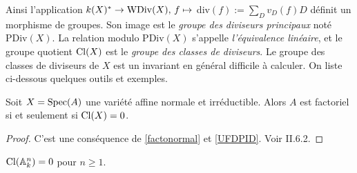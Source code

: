 Ainsi l'application $k(X)^*\rightarrow \operatorname{WDiv}(X),\, f\mapsto $ div$(f):=\sum_D v_D(f)D$ définit un morphisme de groupes. Son image est le \textit{groupe des diviseurs principaux} noté PDiv$(X)$. La relation modulo PDiv$(X)$ s'appelle \textit{l'équivalence linéaire}, et le groupe quotient $\operatorname{Cl}(X)$ est le \textit{groupe des classes de diviseurs}. Le groupe des classes de diviseurs de $X$ est un invariant en général difficile à calculer. On liste ci-dessous quelques outils et exemples.


\begin{prop}\label{AffUFDClgTrifial}
Soit $X=\operatorname{Spec}(A)$ une variété affine normale et irréductible. Alors $A$ est factoriel si et seulement si $\operatorname{Cl}(X)=0$.
\end{prop}
\begin{proof}
C'est une conséquence de \ref{factonormal} et \ref{UFDPID}. Voir \cite{Hartshorne} II.6.2.
\end{proof}

\begin{cor}
$\operatorname{Cl}(\mathbb{A} ^n_k)=0$ pour $n\geq 1$.
\end{cor}

